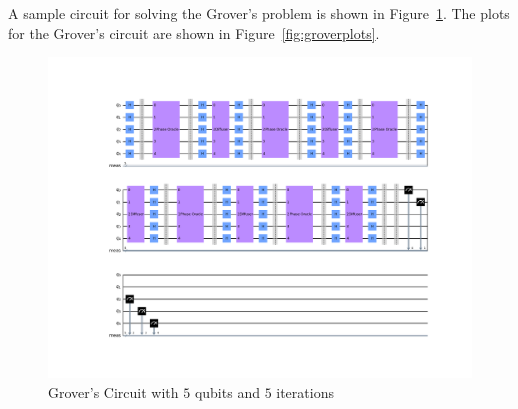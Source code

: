 \documentclass[11pt]{article}
\begin{document}
A sample circuit for solving the Grover's problem is shown in Figure~\ref{fig:grover}. The plots for the Grover's circuit are shown in Figure~\ref{fig:groverplots}.
\begin{figure}[hbtp]
    \centering
    \includegraphics[width=0.8\linewidth]{outputs/grover.png}
    \caption{Grover's Circuit with $5$ qubits and $5$ iterations}
    \label{fig:grover}
\end{figure}
\end{document}
